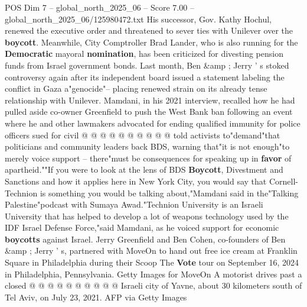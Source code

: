 \begin{textsample}{POS Dim 7 – global\_north\_2025\_06 – Score 7.00 – global\_north\_2025\_06/125980472.txt}
His successor, Gov.
Kathy Hochul, renewed the executive order and threatened to sever ties with Unilever over the \textbf{boycott}.
Meanwhile, City Comptroller Brad Lander, who is also running for the \textbf{Democratic} mayoral \textbf{nomination}, has been criticized for divesting pension funds from Israel government bonds.
Last month, Ben \&amp ; Jerry ' s stoked controversy again after its independent board issued a statement labeling the conflict in Gaza a"genocide"-- placing renewed strain on its already tense relationship with Unilever.
Mamdani, in his 2021 interview, recalled how he had pulled aside co-owner Greenfield to push the West Bank ban following an event where he and other lawmakers advocated for ending qualified immunity for police officers sued for civil @ @ @ @ @ @ @ @ @ @ told activists to"demand"that politicians and community leaders back BDS, warning that"it is not enough"to merely voice support -- there"must be consequences for speaking up in \textbf{favor} of apartheid.""If you were to look at the lens of BDS \textbf{Boycott}, Divestment and Sanctions and how it applies here in New York City, you would say that Cornell-Technion is something you would be talking about,"Mamdani said in the"Talking Palestine"podcast with Sumaya Awad."Technion University is an Israeli University that has helped to develop a lot of weapons technology used by the IDF Israel Defense Force,"said Mamdani, as he voiced support for economic \textbf{boycotts} against Israel.
Jerry Greenfield and Ben Cohen, co-founders of Ben \&amp ; Jerry ' s, partnered with MoveOn to hand out free ice cream at Franklin Square in Philadelphia during their Scoop The \textbf{Vote} tour on September 16, 2024 in Philadelphia, Pennsylvania.
Getty Images for MoveOn A motorist drives past a closed @ @ @ @ @ @ @ @ @ @ Israeli city of Yavne, about 30 kilometers south of Tel Aviv, on July 23, 2021.
AFP via Getty Images

\end{textsample}
